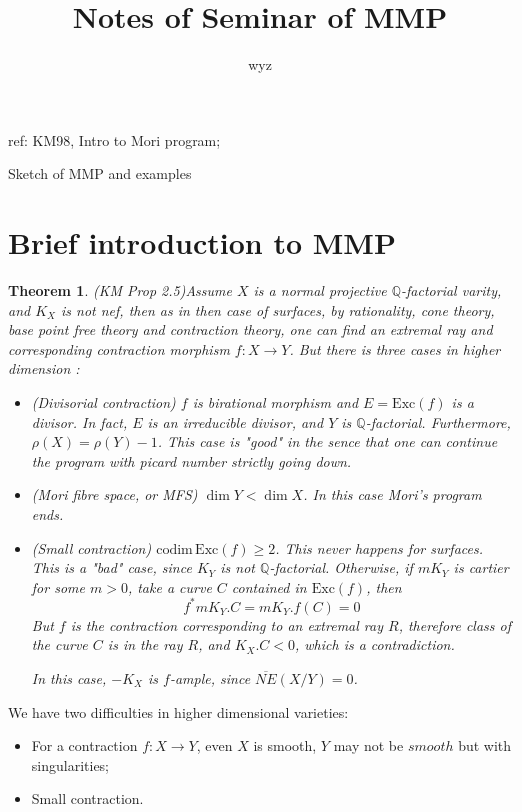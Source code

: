 \documentclass{article}
\title{Notes of Seminar of MMP}
\author{wyz}
\date{}
\newtheorem{thm}[defn]{Theorem}
\begin{document}

ref: KM98, Intro to Mori program;

Sketch of MMP and examples	
\section{Brief introduction to MMP}
\begin{thm}
	(KM Prop 2.5)Assume $ X $ is a normal projective $ \mathbb{Q} $-factorial varity, and $ K_X $ is not nef, then as in then case of surfaces, by rationality, cone theory, base point free theory and contraction theory, one can find an extremal ray and corresponding contraction morphism $ f:X\to Y $. But there is three cases in higher dimension :
	\begin{itemize}
		\item (Divisorial contraction) $ f $ is birational morphism and $ E=\mathrm{Exc} (f) $ is a divisor. In fact, $ E $ is an irreducible divisor, and $ Y $ is $ \mathbb{Q} $-factorial. Furthermore, $ \rho(X)=\rho(Y)-1 $. This case is "good" in the sence that one can continue the program with picard number strictly going down.
		\item (Mori fibre space, or MFS) $ \dim Y<\dim X $. In this case Mori's program ends.
		\item (Small contraction) $ \mathrm{codim}\,\mathrm{Exc}(f)\geqslant 2 $. This never happens for surfaces.  This is a "bad" case, since $ K_Y $ is not $ \mathbb{Q} $-factorial. Otherwise, if $ mK_Y $ is cartier for some $ m>0 $, take a curve $ C $ contained in $ \mathrm{Exc}(f) $, then
		$$ f^*mK_Y .C=mK_Y.f(C)=0$$
		But $ f $ is the contraction corresponding to an extremal ray $ R $, therefore class of the curve $ C $ is in the ray $ R $, and $ K_X.C<0 $, which is a contradiction.
		
		In this case, $ -K_X $ is $ f $-ample, since $ \overline{NE}(X/Y)=0 $.
	\end{itemize}
\end{thm}

We have two difficulties in higher dimensional varieties:
\begin{itemize}
	\item For a contraction $ f:X\to Y $, even $ X $ is smooth, $ Y $ may not be $ smooth $ but with singularities;
	\item Small contraction.
\end{itemize}
\end{document}
